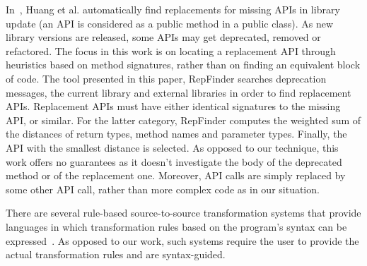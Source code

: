 \documentclass[sigconf,review,anonymous]{acmart}
\begin{document}
In~\cite{DBLP:conf/kbse/Huang0PW021}, Huang et al. automatically find replacements for missing APIs in library update (an API is considered as a public method in a public class). As new library versions are released, some APIs may get deprecated, removed or refactored.
The focus in this work is on locating a replacement API through heuristics based on method signatures, rather than on finding an equivalent block of code.
The tool presented in this paper, {\sc RepFinder} searches deprecation messages, the current library and external libraries in order to find replacement APIs. Replacement APIs must have either identical signatures to the missing API, or similar. For the latter category, {\sc RepFinder} computes the weighted sum of the distances of return types, method names and parameter types. Finally, the API with the smallest distance is selected. As opposed to our technique, this work offers no guarantees as it doesn't
investigate the body of the deprecated method or of the replacement one. Moreover, API calls
are simply replaced by some other API call, rather than more complex code as in our situation.







There are several rule-based source-to-source transformation systems that provide languages in which
transformation rules based on the program's syntax can be expressed~\cite{stratego,txl}. 
As opposed to our work, such systems require the user to provide the actual transformation rules and are syntax-guided.
\end{document}
